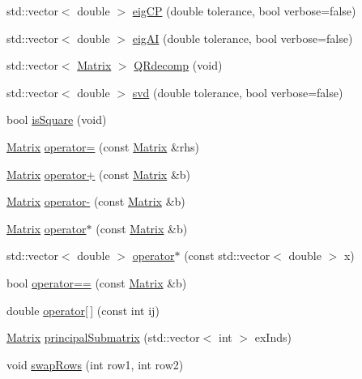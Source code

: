 \begin{DoxyCompactItemize}
\item 
std\+::vector$<$ double $>$ \mbox{\hyperlink{class_matrix_a2df4b81dc518abc9fcd6896e2dafdff0}{eig\+CP}} (double tolerance, bool verbose=false)
\item 
std\+::vector$<$ double $>$ \mbox{\hyperlink{class_matrix_a107beca4305d735f074f6cb6ef97dbc9}{eig\+AI}} (double tolerance, bool verbose=false)
\item 
std\+::vector$<$ \mbox{\hyperlink{class_matrix}{Matrix}} $>$ \mbox{\hyperlink{class_matrix_ae7c92ceca24b8ca00926c93180c4cc24}{Q\+Rdecomp}} (void)
\item 
std\+::vector$<$ double $>$ \mbox{\hyperlink{class_matrix_a9fd5f24302f779d7341fdd06bb23bb90}{svd}} (double tolerance, bool verbose=false)
\item 
bool \mbox{\hyperlink{class_matrix_ae67c274d2425c1323a3a3356c174d071}{is\+Square}} (void)
\item 
\mbox{\hyperlink{class_matrix}{Matrix}} \mbox{\hyperlink{class_matrix_a0355fb02a7719e9b81938702eae3abe2}{operator=}} (const \mbox{\hyperlink{class_matrix}{Matrix}} \&rhs)
\item 
\mbox{\hyperlink{class_matrix}{Matrix}} \mbox{\hyperlink{class_matrix_ab5df6e16d56f931d712dc3b739f3e56d}{operator+}} (const \mbox{\hyperlink{class_matrix}{Matrix}} \&b)
\item 
\mbox{\hyperlink{class_matrix}{Matrix}} \mbox{\hyperlink{class_matrix_ae9f9af2349c3f6520a75116ceba73a77}{operator-\/}} (const \mbox{\hyperlink{class_matrix}{Matrix}} \&b)
\item 
\mbox{\hyperlink{class_matrix}{Matrix}} \mbox{\hyperlink{class_matrix_ac17891c37c77aabb69f2b82e15befb4d}{operator$\ast$}} (const \mbox{\hyperlink{class_matrix}{Matrix}} \&b)
\item 
std\+::vector$<$ double $>$ \mbox{\hyperlink{class_matrix_a049af5ca6904481796a79f94d8cbef31}{operator$\ast$}} (const std\+::vector$<$ double $>$ x)
\item 
bool \mbox{\hyperlink{class_matrix_a9094eaa5bbb1bdf4fb1811dfd163effb}{operator==}} (const \mbox{\hyperlink{class_matrix}{Matrix}} \&b)
\item 
double \mbox{\hyperlink{class_matrix_a0a5a42b681f5ea018e1bc6b6453b86e2}{operator\mbox{[}$\,$\mbox{]}}} (const int ij)
\item 
\mbox{\hyperlink{class_matrix}{Matrix}} \mbox{\hyperlink{class_matrix_a98b1c60f665125f2da72069314794820}{principal\+Submatrix}} (std\+::vector$<$ int $>$ ex\+Inds)
\item 
void \mbox{\hyperlink{class_matrix_a3d028bc7d149b4f87c847cf0ff50aa18}{swap\+Rows}} (int row1, int row2)

\end{DoxyCompactItemize}

